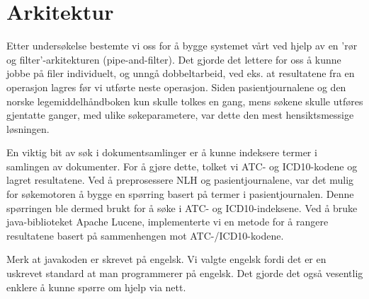 \section{Arkitektur}
\label{sec:arkitektur}

Etter undersøkelse bestemte vi oss for å bygge systemet vårt ved hjelp av en 'rør og filter'-arkitekturen (pipe-and-filter). Det gjorde det lettere for oss å kunne jobbe på filer individuelt, og unngå dobbeltarbeid, ved eks. at resultatene fra en operasjon lagres før vi utførte neste operasjon. Siden pasientjournalene og den norske legemiddelhåndboken kun skulle tolkes en gang, mens søkene skulle utføres gjentatte ganger, med ulike søkeparametere, var dette den mest hensiktsmessige løsningen.


En viktig bit av søk i dokumentsamlinger er å kunne indeksere termer i samlingen av dokumenter. For å gjøre dette, tolket vi ATC- og ICD10-kodene og lagret resultatene. Ved å preprosessere NLH og pasientjournalene, var det mulig for søkemotoren å bygge en spørring basert på termer i pasientjournalen. Denne spørringen ble dermed brukt for å søke i ATC- og ICD10-indeksene. Ved å bruke java-biblioteket Apache Lucene, implementerte vi en metode for å rangere resultatene basert på sammenhengen mot ATC-/ICD10-kodene.

Merk at javakoden er skrevet på engelsk. Vi valgte engelsk fordi det er en uskrevet standard at man programmerer på engelsk. Det gjorde det også vesentlig enklere å kunne spørre om hjelp via nett.

